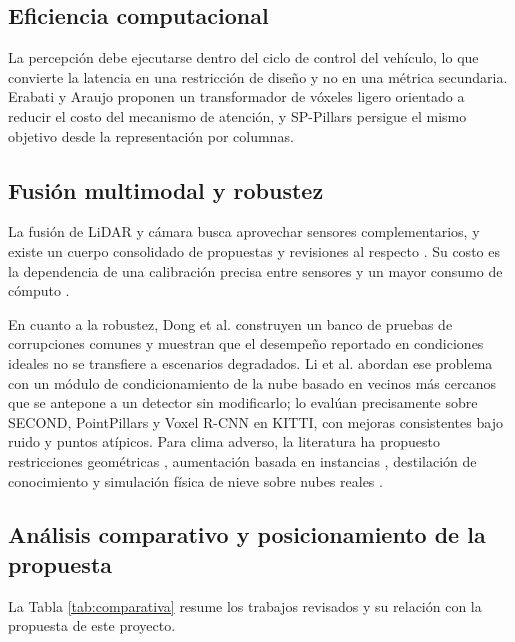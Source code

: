 \documentclass[11pt,letterpaper]{article}
\begin{document}
\subsection{Eficiencia computacional}

La percepción debe ejecutarse dentro del ciclo de control del vehículo, lo que convierte la latencia en una restricción de diseño y no en una métrica secundaria. Erabati y Araujo \cite{erabati2024b} proponen un transformador de vóxeles ligero orientado a reducir el costo del mecanismo de atención, y SP-Pillars \cite{chen2025sp} persigue el mismo objetivo desde la representación por columnas.

\subsection{Fusión multimodal y robustez}

La fusión de LiDAR y cámara busca aprovechar sensores complementarios, y existe un cuerpo consolidado de propuestas y revisiones al respecto \cite{erabati2024a, liu2023, pravallika2024}. Su costo es la dependencia de una calibración precisa entre sensores y un mayor consumo de cómputo \cite{qian2022}.

En cuanto a la robustez, Dong et al. \cite{dong2023} construyen un banco de pruebas de corrupciones comunes y muestran que el desempeño reportado en condiciones ideales no se transfiere a escenarios degradados. Li et al. \cite{li2026} abordan ese problema con un módulo de condicionamiento de la nube basado en vecinos más cercanos que se antepone a un detector sin modificarlo; lo evalúan precisamente sobre SECOND, PointPillars y Voxel R-CNN en KITTI, con mejoras consistentes bajo ruido y puntos atípicos. Para clima adverso, la literatura ha propuesto restricciones geométricas \cite{qi2024}, aumentación basada en instancias \cite{an2026}, destilación de conocimiento \cite{liu2025} y simulación física de nieve sobre nubes reales \cite{ju2026}.

\subsection{Análisis comparativo y posicionamiento de la propuesta}

La Tabla \ref{tab:comparativa} resume los trabajos revisados y su relación con la propuesta de este proyecto.
\end{document}
